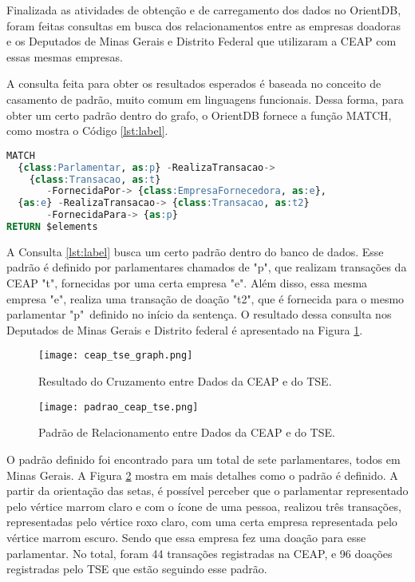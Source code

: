 Finalizada as atividades de obtenção e de carregamento dos dados no OrientDB, foram feitas consultas em busca dos relacionamentos entre as empresas doadoras e os Deputados de Minas Gerais e Distrito Federal que utilizaram a CEAP com essas mesmas empresas.
	
	A consulta feita para obter os resultados esperados é baseada no conceito de casamento de padrão, muito comum em linguagens funcionais. Dessa forma, para obter um certo padrão dentro do grafo, o OrientDB fornece a função MATCH, como mostra o Código \ref{lst:label}.

\begin{lstlisting}[label={lst:label}, caption={Consulta de Relacionamento de Doações entre Deputados e Empresas.},captionpos=b, language=sql]
MATCH 
  {class:Parlamentar, as:p} -RealizaTransacao-> 
  	{class:Transacao, as:t} 
       -FornecidaPor-> {class:EmpresaFornecedora, as:e},
  {as:e} -RealizaTransacao-> {class:Transacao, as:t2} 
  	   -FornecidaPara-> {as:p}
RETURN $elements
\end{lstlisting}

A Consulta \ref{lst:label} busca um certo padrão dentro do banco de dados. Esse padrão é definido por parlamentares chamados de "p", que realizam transações da CEAP "t", fornecidas por uma certa empresa "e". Além disso, essa mesma empresa "e", realiza uma transação de doação "t2", que é fornecida para o mesmo parlamentar "p"\ definido no início da sentença. O resultado dessa consulta nos Deputados de Minas Gerais e Distrito federal é apresentado na Figura \ref{fig:ceap_tse_graph}.

\begin{figure}[H]
\centering
\texttt{[image: ceap\_tse\_graph.png]}
\caption{Resultado do Cruzamento entre Dados da CEAP e do TSE.}
\label{fig:ceap_tse_graph}
\end{figure}

\begin{figure}[H]
\centering
\texttt{[image: padrao\_ceap\_tse.png]}
\caption{Padrão de Relacionamento entre Dados da CEAP e do TSE.}
\label{fig:padrao_ceap_tse}
\end{figure}

O padrão definido foi encontrado para um total de sete parlamentares, todos em Minas Gerais. A Figura \ref{fig:padrao_ceap_tse} mostra em mais detalhes como o padrão é definido. A partir da orientação das setas, é possível perceber que o parlamentar representado pelo vértice marrom claro e com o ícone de uma pessoa, realizou três transações, representadas pelo vértice roxo claro, com uma certa empresa representada pelo vértice marrom escuro. Sendo que essa empresa fez uma doação para esse parlamentar. No total, foram 44 transações registradas na CEAP, e 96 doações registradas pelo TSE que estão seguindo esse padrão.

